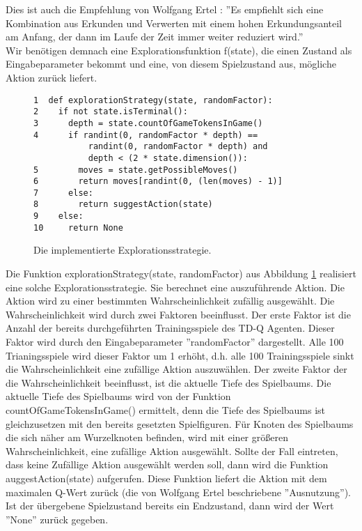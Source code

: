 Dies ist auch die Empfehlung von Wolfgang Ertel \cite[303]{Ertel}: ''Es empfiehlt sich eine Kombination aus Erkunden und Verwerten mit einem hohen Erkundungsanteil am Anfang, der dann im Laufe der Zeit immer weiter reduziert wird.'' \\

Wir benötigen demnach eine Explorationsfunktion f(state), die einen Zustand als Eingabeparameter bekommt und eine, von diesem Spielzustand aus, mögliche Aktion zurück liefert.\\

\begin{figure}[!htbp]
\centering
\begin{lstlisting}[frame=single, mathescape=true]
1  def explorationStrategy(state, randomFactor):
2    if not state.isTerminal():
3      depth = state.countOfGameTokensInGame()
4      if randint(0, randomFactor * depth) == 
           randint(0, randomFactor * depth) and
           depth < (2 * state.dimension()):
5        moves = state.getPossibleMoves()
6        return moves[randint(0, (len(moves) - 1)]
7      else:
8        return suggestAction(state)
9    else:
10     return None
\end{lstlisting}
\caption{Die implementierte Explorationsstrategie.}
\label{fig:Explorationsstrategie}
\end{figure} 

Die Funktion explorationStrategy(state, randomFactor) aus Abbildung \ref{fig:Explorationsstrategie} realisiert eine solche Explorationsstrategie. Sie berechnet eine auszuführende Aktion. Die Aktion wird zu einer bestimmten Wahrscheinlichkeit zufällig ausgewählt. Die Wahrscheinlichkeit wird durch zwei Faktoren beeinflusst. Der erste Faktor ist die Anzahl der bereits durchgeführten Trainingsspiele des TD-Q Agenten. Dieser Faktor wird durch den Eingabeparameter ''randomFactor'' dargestellt. Alle 100 Trianingsspiele wird dieser Faktor um 1 erhöht, d.h. alle 100 Trainingsspiele sinkt die Wahrscheinlichkeit eine zufällige  Aktion auszuwählen. Der zweite Faktor der die Wahrscheinlichkeit beeinflusst, ist die aktuelle Tiefe des Spielbaums. Die aktuelle Tiefe des Spielbaums wird von der Funktion countOfGameTokensInGame() ermittelt, denn die Tiefe des Spielbaums ist gleichzusetzen mit den bereits gesetzten Spielfiguren. Für Knoten des Spielbaums die sich näher am Wurzelknoten befinden, wird mit einer größeren Wahrscheinlichkeit, eine zufällige Aktion ausgewählt. Sollte der Fall eintreten, dass keine Zufällige Aktion ausgewählt werden soll, dann wird die Funktion auggestAction(state) aufgerufen. Diese Funktion liefert die Aktion mit dem maximalen Q-Wert zurück (die von Wolfgang Ertel beschriebene ''Ausnutzung''). Ist der übergebene Spielzustand bereits ein Endzustand, dann wird der Wert ''None'' zurück gegeben.

